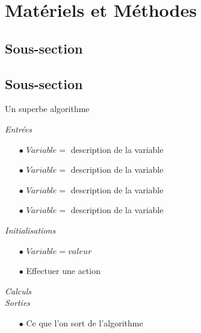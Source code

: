 \section{Matériels et Méthodes}
\noindent

\subsection{Sous-section}
\noindent

    

\subsection{Sous-section}
\noindent

\begin{algorithm}[h]
    \caption{Un superbe algorithme}\label{alg:justanalgorithm}
    \textit{Entrées}
    \begin{itemize}
        
        \item[$\bullet$] $Variable = $ description de la variable
        \item[$\bullet$] $Variable = $ description de la variable
        \item[$\bullet$] $Variable = $ description de la variable
        \item[$\bullet$] $Variable = $ description de la variable
    \end{itemize}
    \textit{Initialisations}
    \begin{itemize}
        \item[$\bullet$] $Variable = valeur$
        \item[$\bullet$] Effectuer une action
    \end{itemize}
    \textit{Calculs}\\
    \textit{Sorties}
    \begin{itemize}
        \item[$\bullet$] Ce que l'on sort de l'algorithme
    \end{itemize}
\end{algorithm}

